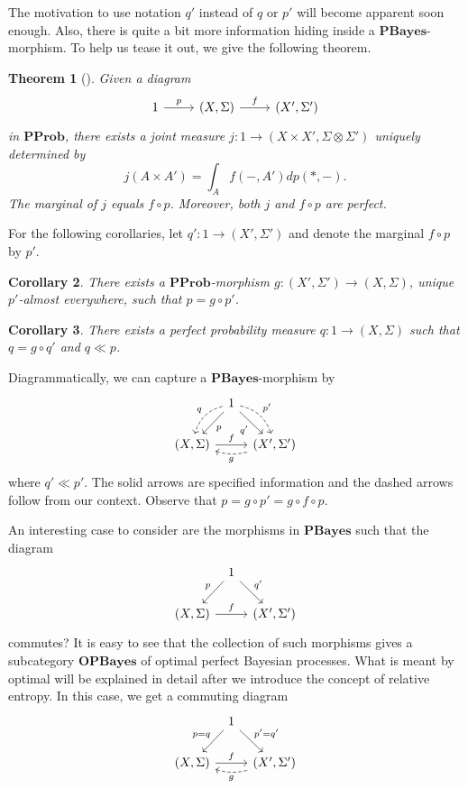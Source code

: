 \documentclass[11pt]{amsart}
\newcommand{\cat}[1]{\mathbf{#1}}
\newcommand{\from}{\colon}
\newtheorem{thm}{Theorem}[section]
\newtheorem{cor}[thm]{Corollary}
\theoremstyle{remark}
\theoremstyle{definition}
\begin{document}
The motivation to use 
notation $q'$ instead of $q$ or $p'$ 
will become apparent soon enough. Also, there 
is quite a bit more information hiding inside 
a $\cat{PBayes}$-morphism. To help us tease it 
out, we give the following theorem.

\begin{thm}[{\cite[Sec.~3.1]{CulbSturtz_CategoricalBayesProb}}]
 \label{thm.Prob 
then map gives joint}
	Given a diagram 
	\[
	\begin{tikzcd}
	1 \ar[r,"p"] & (X,\Sigma) \ar[r,"f"] & (X',\Sigma')
	\end{tikzcd}
	\]
	in $\cat{PProb}$, there exists a joint 
	measure $j \from 1 \to (X \times 
	X',\Sigma \otimes \Sigma')$ uniquely 
	determined by
	\[
	j (A \times A') = \int_A f(-,A')dp(\ast,-).
	\]
	The marginal of $j$ equals $f \circ p$. 
	Moreover, both $j$ and $f \circ p$ are 
	perfect. 
\end{thm}

For the following corollaries, let $q' \from 1 
\to (X',\Sigma')$ and denote the marginal $f 
\circ p$ by $p'$.

\begin{cor}
	There exists a $\cat{PProb}$-morphism $g 
	\from (X',\Sigma') \to 
	(X,\Sigma)$, unique $p'$-almost 
	everywhere, such that $p=g \circ p'$.
\end{cor}

\begin{cor}
	There exists a perfect probability 
	measure $q \from 1 \to (X,\Sigma)$ such 
	that $q=g \circ q'$ and $q \ll p$.
\end{cor}

Diagrammatically, we can capture a 
$\cat{PBayes}$-morphism by
\[
\begin{tikzcd}[column sep=tiny]
{} & 
{1} \ar[dl,"p"] \ar[dr,swap,"q'"] \ar[dr,bend left=30,dashed,"p'"] 
\ar[dl,bend right=30,dashed,swap,"q"] & 
{} \\
{(X,\Sigma)} \ar[rr,"f"] & 
{} & 
{(X',\Sigma')} \ar[ll,dashed,bend left=15,"g"]
\end{tikzcd}
\]
where $q' \ll p'$.  The solid arrows are 
specified information and the dashed arrows 
follow from our context.  Observe that $p=g 
\circ p'= g \circ f \circ p$.

An interesting case to consider are the 
morphisms in $\cat{PBayes}$ such 
that the diagram
\[
\begin{tikzcd}[column sep=tiny]
{} & {1} \ar[dl,swap,"p"] \ar[dr,"q'"] & {} \\
{(X,\Sigma)} \ar[rr,"f"] & {} & {(X',\Sigma')} 
\end{tikzcd}
\]
commutes? It is easy to see that the 
collection of such morphisms gives a 
subcategory $\cat{OPBayes}$ of optimal perfect 
Bayesian processes. What is meant by optimal 
will be explained in detail after we 
introduce the concept of relative entropy. In 
this case, we get a commuting diagram
\[
\begin{tikzcd}[column sep=tiny]
{} & 
{1} \ar[dl,swap,"p=q"] \ar[dr,"p'=q'"] & 
{} \\
{(X,\Sigma)} \ar[rr,"f"] & 
{} & 
{(X',\Sigma')} \ar[ll,dashed,bend left=15,"g"]
\end{tikzcd}
\] 
\end{document}
